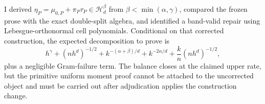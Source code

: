 I derived \(\eta_P=\mu_{0,P}+\pi_P\tau_P\in\mathcal H_d^\beta\) from \(\beta<\min(\alpha,\gamma)\), compared the frozen prose with the exact double-split algebra, and identified a band-valid repair using Lebesgue-orthonormal cell polynomials.  Conditional on that corrected construction, the expected decomposition to prove is
\[
h^\gamma+(nh^d)^{-1/2}+k^{-(\alpha+\beta)/d}+k^{-2\alpha/d}
+\frac{k}{n}(nh^d)^{-1/2},
\]
plus a negligible Gram-failure term.  The balance closes at the claimed upper rate, but the primitive uniform moment proof cannot be attached to the uncorrected object and must be carried out after adjudication applies the construction change.